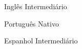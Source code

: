 

\begin{cvskills}

  \cvskill
    {Inglês} %
    {Intermediário} %

  \cvskill
    {Português} %
    {Nativo} %

  \cvskill
    {Espanhol} %
    {Intermediário} %

\end{cvskills}